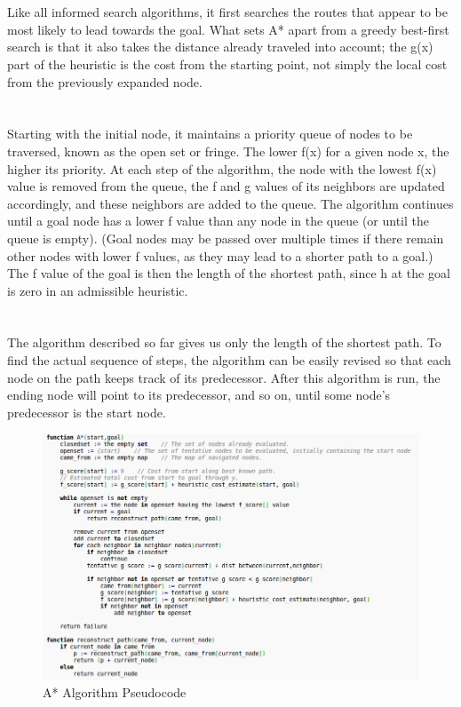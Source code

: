 \paragraph{} ~\\
Like all informed search algorithms, it first searches the routes that appear to be most likely to lead towards the goal. What sets A* apart from a greedy best-first search is that it also takes the distance already traveled into account; the g(x) part of the heuristic is the cost from the starting point, not simply the local cost from the previously expanded node.

\paragraph{} ~\\
Starting with the initial node, it maintains a priority queue of nodes to be traversed, known as the open set or fringe. The lower f(x) for a given node x, the higher its priority. At each step of the algorithm, the node with the lowest f(x) value is removed from the queue, the f and g values of its neighbors are updated accordingly, and these neighbors are added to the queue. The algorithm continues until a goal node has a lower f value than any node in the queue (or until the queue is empty). (Goal nodes may be passed over multiple times if there remain other nodes with lower f values, as they may lead to a shorter path to a goal.) The f value of the goal is then the length of the shortest path, since h at the goal is zero in an admissible heuristic.
\paragraph{} ~\\
The algorithm described so far gives us only the length of the shortest path. To find the actual sequence of steps, the algorithm can be easily revised so that each node on the path keeps track of its predecessor. After this algorithm is run, the ending node will point to its predecessor, and so on, until some node's predecessor is the start node.

\begin{figure}[H]
    \centering
    \includegraphics[width=.8\textwidth]{images/astar_pseudocode.png}
    \caption{A* Algorithm Pseudocode}
    \label{fig:astar_pseudocode}
\end{figure}

